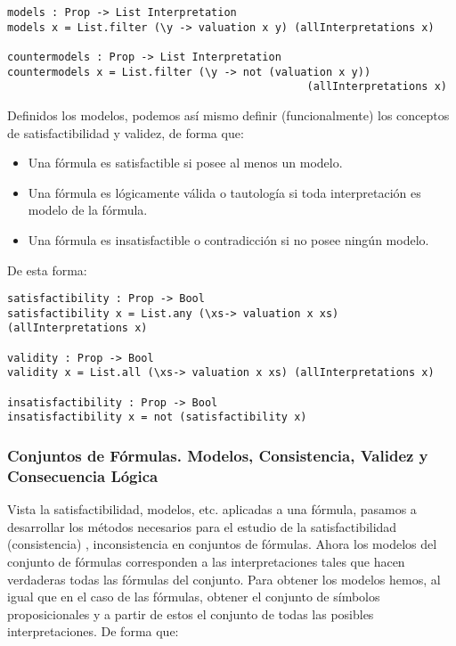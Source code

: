 \documentclass[a4paper]{report}
\begin{document}
\newpage
\begin{lstlisting}[caption= Función para el cálculo de los modelos de una fórmula proposicional]
models : Prop -> List Interpretation
models x = List.filter (\y -> valuation x y) (allInterpretations x)

countermodels : Prop -> List Interpretation
countermodels x = List.filter (\y -> not (valuation x y)) 
                                               (allInterpretations x)
\end{lstlisting}

Definidos los modelos, podemos así mismo definir (funcionalmente) los conceptos de satisfactibilidad y validez, de forma que:

\begin{itemize}
\item Una fórmula es satisfactible si posee al menos un modelo.
\item Una fórmula es lógicamente válida o tautología si toda interpretación es modelo de la fórmula.
\item Una fórmula es insatisfactible o contradicción si no posee ningún modelo.
\end{itemize}

De esta forma:

\begin{lstlisting}[caption={Funciones de Satisfactibilidad, Validez e Insatisfactibilidad}]
satisfactibility : Prop -> Bool
satisfactibility x = List.any (\xs-> valuation x xs) (allInterpretations x)

validity : Prop -> Bool
validity x = List.all (\xs-> valuation x xs) (allInterpretations x)

insatisfactibility : Prop -> Bool
insatisfactibility x = not (satisfactibility x)
\end{lstlisting}

\subsubsection{Conjuntos de Fórmulas. Modelos, Consistencia, Validez y Consecuencia Lógica}

Vista la satisfactibilidad, modelos, etc. aplicadas a una fórmula, pasamos a desarrollar los métodos necesarios para el estudio de la satisfactibilidad (consistencia) , inconsistencia en conjuntos de fórmulas. Ahora los modelos del conjunto de fórmulas corresponden a las interpretaciones tales que hacen verdaderas todas las fórmulas del conjunto. Para obtener los modelos hemos, al igual que en el caso de las fórmulas, obtener el conjunto de símbolos proposicionales y a partir de estos el conjunto de todas las posibles interpretaciones. De forma que:\\
\end{document}
